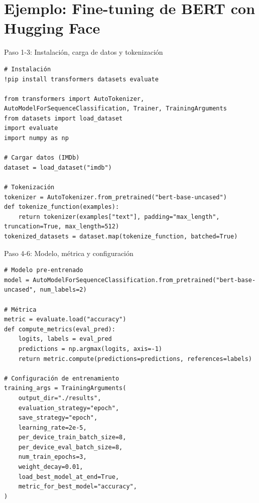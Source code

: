 \documentclass[aspectratio=169, 10pt, xcolor=table]{beamer}
\begin{document}
\section{Ejemplo: Fine-tuning de BERT con Hugging Face}

\begin{frame}[fragile]{Paso 1-3: Instalación, carga de datos y tokenización}
    \begin{lstlisting}
# Instalación
!pip install transformers datasets evaluate

from transformers import AutoTokenizer, AutoModelForSequenceClassification, Trainer, TrainingArguments
from datasets import load_dataset
import evaluate
import numpy as np

# Cargar datos (IMDb)
dataset = load_dataset("imdb")

# Tokenización
tokenizer = AutoTokenizer.from_pretrained("bert-base-uncased")
def tokenize_function(examples):
    return tokenizer(examples["text"], padding="max_length", truncation=True, max_length=512)
tokenized_datasets = dataset.map(tokenize_function, batched=True)
    \end{lstlisting}
\end{frame}

\begin{frame}[fragile]{Paso 4-6: Modelo, métrica y configuración}
    \begin{lstlisting}
# Modelo pre-entrenado
model = AutoModelForSequenceClassification.from_pretrained("bert-base-uncased", num_labels=2)

# Métrica
metric = evaluate.load("accuracy")
def compute_metrics(eval_pred):
    logits, labels = eval_pred
    predictions = np.argmax(logits, axis=-1)
    return metric.compute(predictions=predictions, references=labels)

# Configuración de entrenamiento
training_args = TrainingArguments(
    output_dir="./results",
    evaluation_strategy="epoch",
    save_strategy="epoch",
    learning_rate=2e-5,
    per_device_train_batch_size=8,
    per_device_eval_batch_size=8,
    num_train_epochs=3,
    weight_decay=0.01,
    load_best_model_at_end=True,
    metric_for_best_model="accuracy",
)
    \end{lstlisting}
\end{frame}
\end{document}
